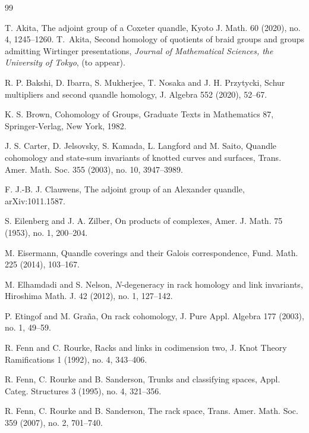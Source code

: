 \documentclass[11pt]{article}
\begin{document}
\begin{thebibliography}{99}
\footnotesize
\setlength{\itemsep}{0pt}
\setlength{\parsep}{0pt}

T. Akita,
\newblock The adjoint group of a Coxeter quandle,
\newblock Kyoto J. Math. 60 (2020), no. 4, 1245--1260.
T.~Akita,
\newblock Second homology of quotients of braid groups and groups admitting Wirtinger presentations,
\newblock \emph{Journal of Mathematical Sciences, the University of Tokyo}, (to appear).

R. P. Bakshi, D. Ibarra, S. Mukherjee, T. Nosaka and J. H. Przytycki,
\newblock Schur multipliers and second quandle homology,
\newblock J. Algebra 552 (2020), 52--67.

K. S. Brown,
\newblock Cohomology of Groups,
\newblock Graduate Texts in Mathematics 87,
\newblock Springer-Verlag, New York, 1982.

J. S. Carter, D. Jelsovsky, S. Kamada, L. Langford and M. Saito,
\newblock Quandle cohomology and state-sum invariants of knotted curves and surfaces,
\newblock Trans. Amer. Math. Soc. 355 (2003), no. 10, 3947--3989.

F. J.-B. J. Clauwens,
\newblock The adjoint group of an Alexander quandle,
\newblock arXiv:1011.1587.

S. Eilenberg and J. A. Zilber,
\newblock On products of complexes,
\newblock Amer. J. Math. 75 (1953), no. 1, 200--204.

M. Eisermann,
\newblock Quandle coverings and their Galois correspondence,
\newblock Fund. Math. 225 (2014), 103--167.

M. Elhamdadi and S. Nelson,
\newblock $N$-degeneracy in rack homology and link invariants,
\newblock Hiroshima Math. J. 42 (2012), no. 1, 127--142.

P. Etingof and M. Gra\~na,
\newblock On rack cohomology,
\newblock J. Pure Appl. Algebra 177 (2003), no. 1, 49--59.

R. Fenn and C. Rourke,
\newblock Racks and links in codimension two,
\newblock J. Knot Theory Ramifications 1 (1992), no. 4, 343--406.

R. Fenn, C. Rourke and B. Sanderson,
\newblock Trunks and classifying spaces,
\newblock Appl. Categ. Structures 3 (1995), no. 4, 321--356.

R. Fenn, C. Rourke and B. Sanderson,
\newblock The rack space,
\newblock Trans. Amer. Math. Soc. 359 (2007), no. 2, 701--740.


\end{thebibliography}
\end{document}
